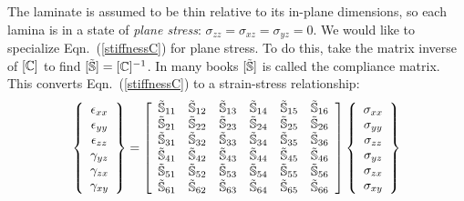 \documentclass[11pt]{article}
\begin{document}
The laminate is assumed to be thin relative to its in-plane dimensions, so each lamina is in a state of \emph{plane stress}:  $\sigma_{zz} = \sigma_{xz} = \sigma_{yz} = 0$.  We would like to specialize Eqn.~(\ref{stiffnessC}) for plane stress.  To do this, take the matrix inverse of $[ \mathbb{C} ]$ to find $[ \tilde{\mathbb{S}} ] = [ \mathbb{C} ]^{-1}$.  In many books $[ \tilde{\mathbb{S}} ]$  is called the compliance matrix.  This converts Eqn.~(\ref{stiffnessC}) to a strain-stress relationship:
\begin{equation}
        \left\{ \begin{array}{c}
           \epsilon_{xx}  \\  \epsilon_{yy}  \\  \epsilon_{zz} \\  \gamma_{yz} \\ \gamma_{zx} \\  \gamma_{xy}
           \end{array} \right\}
           =
              \left[ \begin{array}{cccccc}
     \tilde{\mathbb{S}}_{11} &  \tilde{\mathbb{S}}_{12} &  \tilde{\mathbb{S}}_{13} &  \tilde{\mathbb{S}}_{14} &  \tilde{\mathbb{S}}_{15} &  \tilde{\mathbb{S}}_{16} \\
     \tilde{\mathbb{S}}_{21} &  \tilde{\mathbb{S}}_{22} &  \tilde{\mathbb{S}}_{23} &  \tilde{\mathbb{S}}_{24} &  \tilde{\mathbb{S}}_{25} &  \tilde{\mathbb{S}}_{26} \\
     \tilde{\mathbb{S}}_{31} &  \tilde{\mathbb{S}}_{32} &  \tilde{\mathbb{S}}_{33} &  \tilde{\mathbb{S}}_{34} &  \tilde{\mathbb{S}}_{35} &  \tilde{\mathbb{S}}_{36} \\
     \tilde{\mathbb{S}}_{41} &  \tilde{\mathbb{S}}_{42} &  \tilde{\mathbb{S}}_{43} &  \tilde{\mathbb{S}}_{44} &  \tilde{\mathbb{S}}_{45} &  \tilde{\mathbb{S}}_{46} \\
     \tilde{\mathbb{S}}_{51} &  \tilde{\mathbb{S}}_{52} &  \tilde{\mathbb{S}}_{53} &  \tilde{\mathbb{S}}_{54} &  \tilde{\mathbb{S}}_{55} &  \tilde{\mathbb{S}}_{56} \\
     \tilde{\mathbb{S}}_{61} &  \tilde{\mathbb{S}}_{62} &  \tilde{\mathbb{S}}_{63} &  \tilde{\mathbb{S}}_{64} &  \tilde{\mathbb{S}}_{65} &  \tilde{\mathbb{S}}_{66} 
    \end{array} \right] 
    \left\{ \begin{array}{c}
           \sigma_{xx}  \\  \sigma_{yy}  \\  \sigma_{zz} \\  \sigma_{yz} \\ \sigma_{zx} \\  \sigma_{xy}
           \end{array} \right\}
     \label{3Dcompliance}
 \end{equation}
\end{document}
